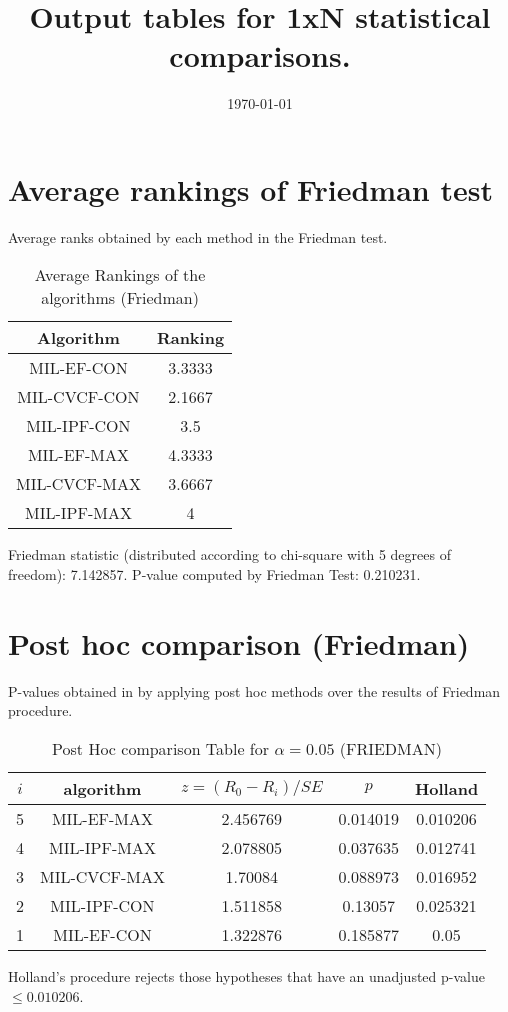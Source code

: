 \documentclass[a4paper,10pt]{article}
\title{Output tables for 1xN statistical comparisons.}
\author{}
\date{\today}
\begin{document}
\begin{landscape}
\pagestyle{empty}
\maketitle
\thispagestyle{empty}

\section{Average rankings of Friedman test}


Average ranks obtained by each method in the Friedman test.

\begin{table}[!htp]
\centering
\begin{tabular}{|c|c|}\hline
Algorithm&Ranking\\\hline
MIL-EF-CON&3.3333\\MIL-CVCF-CON&2.1667\\MIL-IPF-CON&3.5\\MIL-EF-MAX&4.3333\\MIL-CVCF-MAX&3.6667\\MIL-IPF-MAX&4\\\hline\end{tabular}
\caption{Average Rankings of the algorithms (Friedman)}
\end{table}

Friedman statistic (distributed according to chi-square with 5 degrees of freedom): 7.142857. \newline P-value computed by Friedman Test: 0.210231.\newline


\newpage

\section{Post hoc comparison (Friedman)}


P-values obtained in by applying post hoc methods over the results of Friedman procedure.

\begin{table}[!htp]
\centering\footnotesize
\begin{tabular}{ccccc}
$i$&algorithm&$z=(R_0 - R_i)/SE$&$p$&Holland\\
\hline5&MIL-EF-MAX&2.456769&0.014019&0.010206\\4&MIL-IPF-MAX&2.078805&0.037635&0.012741\\3&MIL-CVCF-MAX&1.70084&0.088973&0.016952\\2&MIL-IPF-CON&1.511858&0.13057&0.025321\\1&MIL-EF-CON&1.322876&0.185877&0.05\\\hline
\end{tabular}
\caption{Post Hoc comparison Table for $\alpha=0.05$ (FRIEDMAN)}
\end{table}Holland's procedure rejects those hypotheses that have an unadjusted p-value $\le0.010206$.



\end{landscape}
\end{document}
